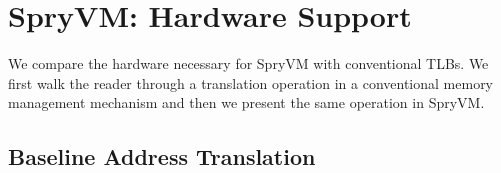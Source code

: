 


\section{SpryVM: Hardware Support}
\label{sec:associativity}

%


We compare the hardware necessary for SpryVM with conventional
TLBs. We first walk the reader through a translation operation in a
conventional memory management mechanism and then we present the same
operation in SpryVM.

\subsection{Baseline Address Translation}

